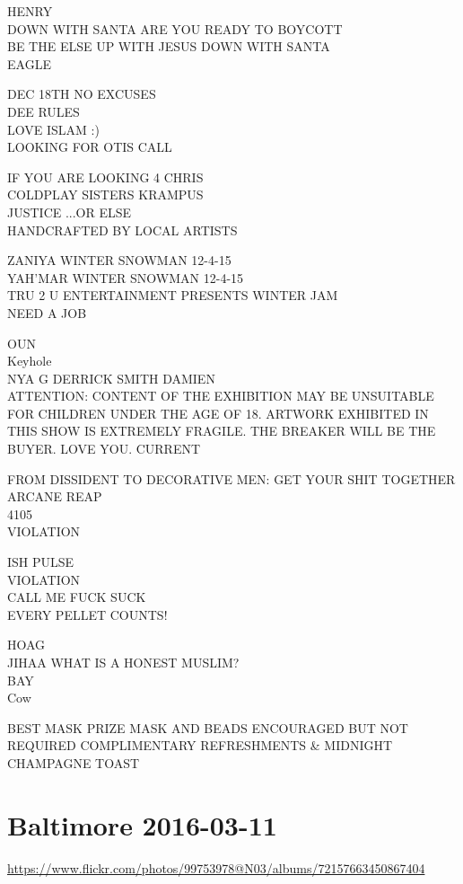 \documentclass[10pt,letterpaper]{article}
\begin{document}
HENRY\\
DOWN WITH SANTA ARE YOU READY TO BOYCOTT\\
BE THE ELSE UP WITH JESUS DOWN WITH SANTA\\
EAGLE

DEC 18TH NO EXCUSES\\
DEE RULES\\
LOVE ISLAM :)\\
LOOKING FOR OTIS CALL

IF YOU ARE LOOKING 4 CHRIS\\
COLDPLAY SISTERS KRAMPUS\\
JUSTICE ...OR ELSE\\
HANDCRAFTED BY LOCAL ARTISTS

ZANIYA WINTER SNOWMAN 12{-}4{-}15\\
YAH'MAR WINTER SNOWMAN 12{-}4{-}15\\
TRU 2 U ENTERTAINMENT PRESENTS WINTER JAM\\
NEED A JOB

OUN\\
Keyhole\\
NYA G DERRICK SMITH DAMIEN\\
ATTENTION: CONTENT OF THE EXHIBITION MAY BE UNSUITABLE FOR CHILDREN UNDER THE AGE OF 18.  ARTWORK EXHIBITED IN THIS SHOW IS EXTREMELY FRAGILE.  THE BREAKER WILL BE THE BUYER.  LOVE YOU.  CURRENT

FROM DISSIDENT TO DECORATIVE MEN: GET YOUR SHIT TOGETHER\\
ARCANE REAP\\
4105\\
VIOLATION

ISH PULSE\\
VIOLATION\\
CALL ME FUCK SUCK\\
EVERY PELLET COUNTS!

HOAG\\
JIHAA WHAT IS A HONEST MUSLIM?\\
BAY\\
Cow

BEST MASK PRIZE MASK AND BEADS ENCOURAGED BUT NOT REQUIRED COMPLIMENTARY REFRESHMENTS \& MIDNIGHT CHAMPAGNE TOAST


\section*{Baltimore 2016-03-11}

\url{https://www.flickr.com/photos/99753978@N03/albums/72157663450867404}
\end{document}
